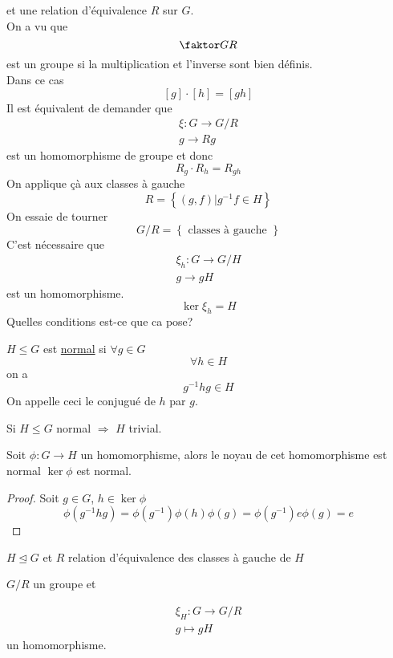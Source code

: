 \documentclass[../main.tex]{subfiles}
\begin{document}
et une relation d'équivalence $R$ sur $G$.\\
On a vu que 
\[ 
\faktor G R
\]
est un groupe si la multiplication et l'inverse sont bien définis.\\
Dans ce cas
\[ 
[ g] \cdot [ h] = [ gh] 
\]
Il est équivalent de demander que
\begin{align*}
\xi: G \to G / R\\
g \to Rg
\end{align*}
est un homomorphisme de groupe et donc
\[ 
R_g \cdot R_h = R_{gh} 
\]
On applique çà aux classes à gauche
\[ 
	R= \left\{ ( g,f) | g^{-1}f \in H \right\} 
\]
On essaie de tourner 
\[ 
G / R = \left\{ \text{ classes à gauche }  \right\} 
\]
C'est nécessaire que 
\begin{align*}
\xi_h : G \to G/ H\\
g \to gH
\end{align*}
est un homomorphisme.\\
\[ 
\ker \xi_h = H
\]
Quelles conditions est-ce que ca pose?
\begin{defn}
	$H \leq G$ est \underline{normal} si $\forall g \in G$ 
	\[ 
	\forall h \in H
	\]
	on a 
	\[ 
	g^{-1}h g \in H
	\]
	On appelle ceci le conjugué de $h $ par $g$.
	
\end{defn}
\begin{defn}
	Si $H \leq G$ normal $\Rightarrow$ $H$ trivial.

\end{defn}
\begin{propo}
	Soit $\phi: G \to H$ un homomorphisme, alors le noyau de cet homomorphisme est normal $\ker \phi$ est normal.
\end{propo}
\begin{proof}
Soit $g\in G$, $h \in \ker \phi$ 
\[ 
	\phi( g^{-1}h g)  = \phi( g^{-1}) \phi( h) \phi( g) = \phi( g^{-1}) e \phi( g) = e
\]

\end{proof}
\begin{thm}
$H \unlhd G$ et $R$ relation d'équivalence des classes à gauche de $H$ 
\item $G / R$ un groupe et

\item 
	\begin{align*}
	\xi_H : G \to G / R\\
	g \mapsto g H
	\end{align*}
	un homomorphisme.
\end{thm}
\end{document}
